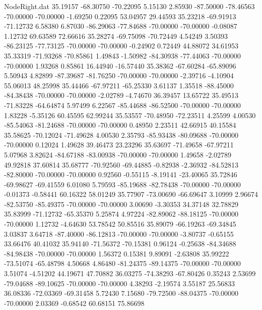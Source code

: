 \begin{filecontents}{NodeRight.dat}
  35.19157  -68.30750  -70.22095     5.15130    2.85930  -87.50000  -78.46563  -70.00000  -70.00000   -1.69250    0.22095   53.04957   29.44593
  35.23218  -69.91913  -71.12732     6.58380    6.87030  -86.29063  -77.84688  -70.00000  -70.00000   -0.08087    1.12732   69.63589   72.66616
  35.28274  -69.75098  -70.72449     4.54249    3.50393  -86.23125  -77.73125  -70.00000  -70.00000   -0.24902    0.72449   44.88072   34.61953
  35.33319  -71.93268  -70.85861     1.49843   -1.50982  -84.30938  -77.44063  -70.00000  -70.00000    1.93268    0.85861   16.44940  -16.57440
  35.38362  -67.60284  -65.89096     5.50943    4.82899  -87.39687  -81.76250  -70.00000  -70.00000   -2.39716   -4.10904   55.06013   48.25998
  35.44466  -67.97211  -65.25330     3.61137    1.35518  -88.45000  -84.38438  -70.00000  -70.00000   -2.02789   -4.74670   36.39457   13.65722
  35.49513  -71.83228  -64.64874     5.97499    6.22567  -85.44688  -86.52500  -70.00000  -70.00000    1.83228   -5.35126   60.45595   62.99244
  35.53557  -70.48950  -72.23511     4.25599    4.00530  -85.54063  -81.24688  -70.00000  -70.00000    0.48950    2.23511   42.66915   40.15584
  35.58625  -70.12024  -71.49628     4.00530    2.35793  -85.93438  -80.09688  -70.00000  -70.00000    0.12024    1.49628   39.46473   23.23296
  35.63697  -71.49658  -67.97211     5.07968    3.82624  -84.67188  -83.00938  -70.00000  -70.00000    1.49658   -2.02789   49.92818   37.60814
  35.68777  -70.92560  -69.44885    -0.82938   -2.36932  -84.52813  -82.80000  -70.00000  -70.00000    0.92560   -0.55115   -8.19141  -23.40065
  35.72846  -69.98627  -69.41559     6.01080    5.79593  -85.19688  -82.78438  -70.00000  -70.00000   -0.01373   -0.58441   60.16322   58.01249
  35.77907  -73.00690  -66.69647     3.10999    2.96674  -82.53750  -85.49375  -70.00000  -70.00000    3.00690   -3.30353   34.37148   32.78829
  35.83999  -71.12732  -65.35370     5.25874    4.97224  -82.89062  -88.18125  -70.00000  -70.00000    1.12732   -4.64630   53.78542   50.85516
  35.89079  -66.19263  -69.34845     3.03837    3.64718  -87.40000  -86.12813  -70.00000  -70.00000   -3.80737   -0.65155   33.66476   40.41032
  35.94140  -71.56372  -70.15381     0.96124   -0.25638  -84.34688  -84.98438  -70.00000  -70.00000    1.56372    0.15381    9.89091   -2.63808
  35.99222  -73.51074  -65.48798     4.50668    4.86480  -81.24375  -89.14375  -70.00000  -70.00000    3.51074   -4.51202   44.19671   47.70882
  36.03275  -74.38293  -67.80426     0.35243    2.53699  -79.04688  -89.10625  -70.00000  -70.00000    4.38293   -2.19574    3.55187   25.56833
  36.08336  -72.03369  -69.31458     5.72430    7.15680  -79.72500  -88.04375  -70.00000  -70.00000    2.03369   -0.68542   60.68151   75.86698

\end{filecontents}
